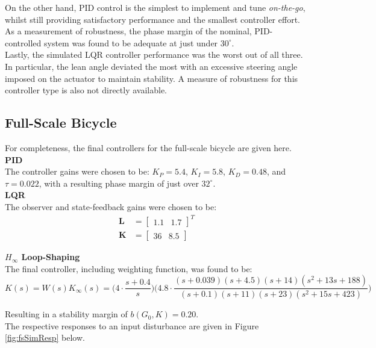 On the other hand, PID control is the simplest to implement and tune \textit{on-the-go}, whilst still providing satisfactory performance and the smallest controller effort. As a measurement of robustness, the phase margin of the nominal, PID-controlled system was found to be adequate at just under $30^{\circ}$. \\

Lastly, the simulated LQR controller performance was the worst out of all three. In particular, the lean angle deviated the most with an excessive steering angle imposed on the actuator to maintain stability. A measure of robustness for this controller type is also not directly available.

\subsection{Full-Scale Bicycle}
For completeness, the final controllers for the full-scale bicycle are given here. \\

\textbf{PID} \\
The controller gains were chosen to be: $K_P=5.4$, $K_I=5.8$, $K_D=0.48$, and $\tau=0.022$, with a resulting phase margin of just over $32^{\circ}$. \\

\textbf{LQR} \\
The observer and state-feedback gains were chosen to be:
\begin{align*}
\mathbf{L} &= \begin{bmatrix}
1.1 & 1.7
\end{bmatrix}^T \\
\mathbf{K} &= \begin{bmatrix}
36 & 8.5
\end{bmatrix}
\end{align*}

\textbf{$H_{\infty}$ Loop-Shaping} \\
The final controller, including weighting function, was found to be:
\begin{equation*}
K(s) = W(s) K_{\infty}(s) = \Big( 4 \cdot \frac{s+0.4}{s} \Big) \Big(4.8 \cdot \frac{(s+0.039)(s+4.5)(s+14)(s^2+13s+188)}{(s+0.1)(s+11)(s+23)(s^2+15s+423)} \Big)
\end{equation*}

Resulting in a stability margin of $b(G_0,K)=0.20$. \\

The respective responses to an input disturbance are given in Figure \ref{fig:fsSimResp} below.

